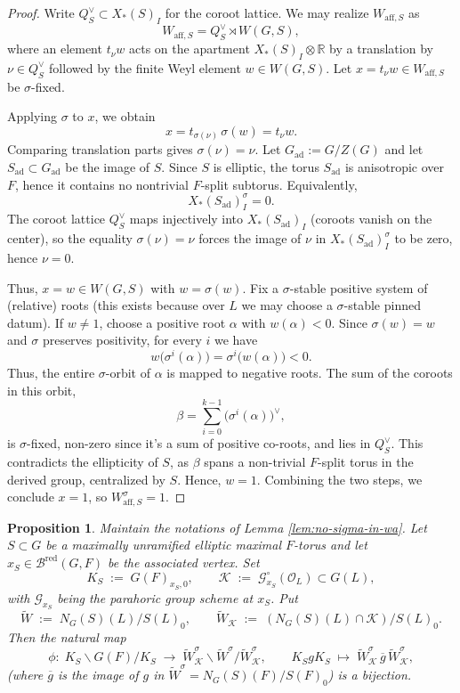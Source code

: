 \documentclass[american]{article}
\numberwithin{equation}{section}
\numberwithin{figure}{section}
\theoremstyle{plain}
\newtheorem{proposition}[theorem]{Proposition}
\theoremstyle{definition}
\theoremstyle{remark}
\begin{document}
\begin{proof}
Write $Q^\vee_S\subset X_*(S)_I$ for the coroot lattice. We may realize $W_{\mathrm{aff},S}$ as
\[
   W_{\mathrm{aff},S}=Q^\vee_S\rtimes W(G,S),
\]
where an element $t_\nu w$ acts on the apartment $X_*(S)_I\otimes\mathbb{R}$ by a translation by $\nu\in Q^\vee_S$ followed by the finite Weyl element $w\in W(G,S)$. Let $x=t_\nu w\in W_{\mathrm{aff},S}$ be $\sigma$-fixed.

Applying $\sigma$ to $x$, we obtain
\[
  x=t_{\sigma(\nu)}\,\sigma(w)=t_\nu w.
\]
Comparing translation parts gives \(\sigma(\nu)=\nu\).
Let \(G_{\mathrm{ad}}:=G/Z(G)\) and let \(S_{\mathrm{ad}}\subset G_{\mathrm{ad}}\) be the image of \(S\). Since \(S\) is elliptic, the torus \(S_{\mathrm{ad}}\) is anisotropic over \(F\), hence it contains no nontrivial \(F\)-split subtorus. Equivalently,
\[
X_*(S_{\mathrm{ad}})_I^{\sigma}=0.
\]
The coroot lattice \(Q_S^\vee\) maps injectively into \(X_*(S_{\mathrm{ad}})_I\) (coroots vanish on the center), so the equality \(\sigma(\nu)=\nu\) forces the image of \(\nu\) in \(X_*(S_{\mathrm{ad}})_I^{\sigma}\) to be zero, hence \(\nu=0\).


Thus, \(x = w \in W(G, S)\) with \(w = \sigma(w)\). Fix a $\sigma$-stable positive system of (relative) roots (this exists because over $L$ we may choose a $\sigma$-stable pinned datum). If $w\neq 1$, choose a positive root $\alpha$ with $w(\alpha)<0$.
Since $\sigma(w)=w$ and $\sigma$ preserves positivity, for every $i$ we have
\[
w\bigl(\sigma^i(\alpha)\bigr)=\sigma^i\bigl(w(\alpha)\bigr)<0.
\]
Thus, the entire \(\sigma\)-orbit of \(\alpha\) is mapped to negative roots. The sum of the coroots in this orbit,
\[
\beta = \sum_{i=0}^{k-1} \bigl(\sigma^i(\alpha)\bigr)^\vee,
\]
is \(\sigma\)-fixed, non-zero since it's a sum of positive co-roots, and lies in \(Q_S^\vee\). This contradicts the ellipticity of \(S\), as \(\beta\) spans a non-trivial \(F\)-split torus in the derived group, centralized by \(S\). Hence, \(w = 1\).
Combining the two steps, we conclude $x=1$, so $W_{\mathrm{aff},S}^{\sigma}=1$.
\end{proof}
\begin{proposition}\label{prop:sigma-Cartan}
Maintain the notations of Lemma \ref{lem:no-sigma-in-wa}.  
Let \(S\subset G\) be a maximally un\-ramified elliptic maximal \(F\)-torus and let
\(
  x_S\in\mathscr B^{\mathrm{red}}(G,F)
\)
be the associated vertex. Set
\[
K_S \;:=\; G(F)_{x_S,0}, 
\qquad
\mathcal K \;:=\; \mathcal G_{x_S}^{\circ}(\mathcal O_L)\subset G(L),
\]
with  \(\mathcal G_{x_S}\) being the parahoric group scheme at \(x_S\). Put
\[
  \widetilde W \;:=\; N_G(S)(L)\big/S(L)_0,
  \qquad
  \widetilde W_{\mathcal K}\;:=\;(N_G(S)(L)\cap\mathcal K)\big/S(L)_0 .
\]
Then the natural map
\[
  \phi:\;
  K_S\!\backslash G(F)/K_S
  \; \longrightarrow\;
  \widetilde W_{\mathcal K}^{\sigma}\!\backslash
  \widetilde W^{\sigma}/
  \widetilde W_{\mathcal K}^{\sigma},\qquad 
  K_S g K_S\;\longmapsto\;
  \widetilde W_{\mathcal K}^{\sigma}\,\overline{g}\,\widetilde W_{\mathcal K}^{\sigma},
\]
(where \(\overline{g}\) is the image of \(g\) in
\(\widetilde W^{\sigma}=N_G(S)(F)/S(F)_0\))
is a bijection.
\end{proposition}
\end{document}
